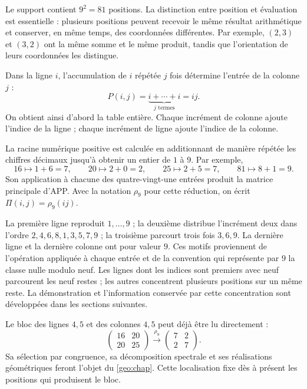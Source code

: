Le support contient $9^2=81$ positions. La distinction entre position et évaluation est essentielle : plusieurs positions peuvent recevoir le même résultat arithmétique et conserver, en même temps, des coordonnées différentes. Par exemple, $(2,3)$ et $(3,2)$ ont la même somme et le même produit, tandis que l'orientation de leurs coordonnées les distingue.

Dans la ligne $i$, l'accumulation de $i$ répétée $j$ fois détermine l'entrée de la colonne $j$ :
\[
 P(i,j)=\underbrace{i+\cdots+i}_{j\text{ termes}}=ij.
\]
On obtient ainsi d'abord la table entière. Chaque incrément de colonne ajoute l'indice de la ligne ; chaque incrément de ligne ajoute l'indice de la colonne.



La racine numérique positive est calculée en additionnant de manière répétée les chiffres décimaux jusqu'à obtenir un entier de $1$ à $9$. Par exemple,
\[
 16\longmapsto1+6=7,\qquad
 20\longmapsto2+0=2,\qquad
 25\longmapsto2+5=7,\qquad
 81\longmapsto8+1=9.
\]
Son application à chacune des quatre-vingt-une entrées produit la matrice principale d'APP. Avec la notation $\rho_9$ pour cette réduction, on écrit $\Pi(i,j)=\rho_9(ij)$.



La première ligne reproduit $1,\ldots,9$ ; la deuxième distribue l'incrément deux dans l'ordre $2,4,6,8,1,3,5,7,9$ ; la troisième parcourt trois fois $3,6,9$. La dernière ligne et la dernière colonne ont pour valeur $9$. Ces motifs proviennent de l'opération appliquée à chaque entrée et de la convention qui représente par $9$ la classe nulle modulo neuf. Les lignes dont les indices sont premiers avec neuf parcourent les neuf restes ; les autres concentrent plusieurs positions sur un même reste. La démonstration et l'information conservée par cette concentration sont développées dans les sections suivantes.

Le bloc des lignes $4,5$ et des colonnes $4,5$ peut déjà être lu directement :
\[
 \begin{pmatrix}16&20\\20&25\end{pmatrix}
 \xrightarrow{\ \rho_9\ }
 \begin{pmatrix}7&2\\2&7\end{pmatrix}.
\]
Sa sélection par congruence, sa décomposition spectrale et ses réalisations géométriques feront l'objet du \cref{geo:chap}. Cette localisation fixe dès à présent les positions qui produisent le bloc.

